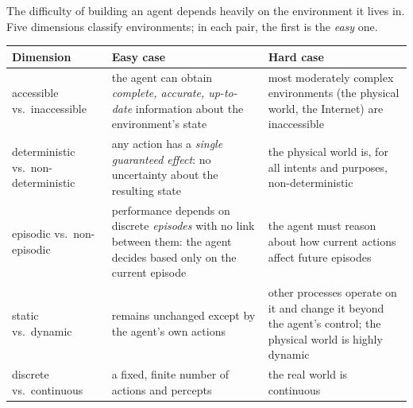 The difficulty of building an agent depends heavily on the environment it lives in. Five
dimensions classify environments; in each pair, the first is the \emph{easy} one.

\begin{center}
\small
\renewcommand{\arraystretch}{1.2}
\begin{tabularx}{\linewidth}{@{}>{\raggedright\arraybackslash}p{2.6cm} >{\raggedright\arraybackslash}X >{\raggedright\arraybackslash}X@{}}
\toprule
\textbf{Dimension} & \textbf{Easy case} & \textbf{Hard case} \\
\midrule
accessible vs.\ inaccessible & the agent can obtain \emph{complete, accurate, up-to-date}
  information about the environment's state & most moderately complex environments
  (the physical world, the Internet) are inaccessible \\
deterministic vs.\ non-deterministic & any action has a \emph{single guaranteed effect}: no
  uncertainty about the resulting state & the physical world is, for all intents and
  purposes, non-deterministic \\
episodic vs.\ non-episodic & performance depends on discrete \emph{episodes} with no link
  between them: the agent decides based only on the current episode & the agent must reason
  about how current actions affect future episodes \\
static vs.\ dynamic & remains unchanged except by the agent's own actions & other processes
  operate on it and change it beyond the agent's control; the physical world is highly
  dynamic \\
discrete vs.\ continuous & a fixed, finite number of actions and percepts & the real
  world is continuous \\
\bottomrule
\end{tabularx}
\end{center}


